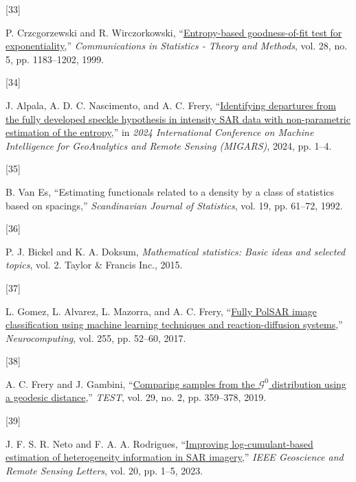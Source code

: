 \documentclass[
  lettersize  journal,
]{IEEEtran}%
\newlength{\cslhangindent}
\newlength{\csllabelwidth}
\newenvironment{CSLReferences}[2] %
 {\begin{list}{}{%
  \setlength{\itemindent}{0pt}
  \setlength{\leftmargin}{0pt}
  \setlength{\parsep}{0pt}
  \ifodd #1
   \setlength{\leftmargin}{\cslhangindent}
   \setlength{\itemindent}{-1\cslhangindent}
  \fi
  \setlength{\itemsep}{#2\baselineskip}}}
 {\end{list}}
\newcommand{\CSLLeftMargin}[1]{\parbox[t]{\csllabelwidth}{\strut#1\strut}}
\newcommand{\CSLRightInline}[1]{\parbox[t]{\linewidth - \csllabelwidth}{\strut#1\strut}}
\providecommand{\DIFaddbegin}{} %
\providecommand{\DIFaddend}{} %
\providecommand{\DIFdelbegin}{} %
\providecommand{\DIFdelend}{} %
\providecommand{\DIFscaledelfig}{0.5}
\newlength{\DIFdelgraphicswidth} %
\newlength{\DIFdelgraphicsheight} %
\providecommand{\DIFaddincludegraphics}[2][]{{\color{blue}\fbox{\DIFOincludegraphics[#1]{#2}}}} %
\providecommand{\DIFdelincludegraphics}[2][]{%
\sbox{\DIFdelgraphicsbox}{\DIFOincludegraphics[#1]{#2}}%
\settoboxwidth{\DIFdelgraphicswidth}{\DIFdelgraphicsbox} %
\settoboxtotalheight{\DIFdelgraphicsheight}{\DIFdelgraphicsbox} %
\scalebox{\DIFscaledelfig}{%
\parbox[b]{\DIFdelgraphicswidth}{\usebox{\DIFdelgraphicsbox}\\[-\baselineskip] \rule{\DIFdelgraphicswidth}{0em}}\llap{\resizebox{\DIFdelgraphicswidth}{\DIFdelgraphicsheight}{%
\setlength{\unitlength}{\DIFdelgraphicswidth}%
\begin{picture}(1,1)%
\thicklines\linethickness{2pt} %
{\color[rgb]{1,0,0}\put(0,0){\framebox(1,1){}}}%
{\color[rgb]{1,0,0}\put(0,0){\line( 1,1){1}}}%
{\color[rgb]{1,0,0}\put(0,1){\line(1,-1){1}}}%
\end{picture}%
}\hspace*{3pt}}} %
} %
\DeclareRobustCommand{\DIFaddbegin}{\DIFOaddbegin \let\includegraphics\DIFaddincludegraphics} %
\DeclareRobustCommand{\DIFaddend}{\DIFOaddend \let\includegraphics\DIFOincludegraphics} %
\DeclareRobustCommand{\DIFdelbegin}{\DIFOdelbegin \let\includegraphics\DIFdelincludegraphics} %
\DeclareRobustCommand{\DIFdelend}{\DIFOaddend \let\includegraphics\DIFOincludegraphics} %
\begin{document}
\begin{CSLReferences}{0}{0}
\DIFdelbegin %
\DIFdelend \DIFaddbegin \CSLLeftMargin{{[}33{]} }\DIFaddend %
\CSLRightInline{P. Crzcgorzewski and R. Wirczorkowski,
{``\href{https://doi.org/10.1080/03610929908832351}{Entropy-based
goodness-of-fit test for exponentiality},''} \emph{Communications in
Statistics - Theory and Methods}, vol. 28, no. 5, pp. 1183--1202, 1999.
}

\DIFdelbegin %
\DIFdelend \DIFaddbegin \CSLLeftMargin{{[}34{]} }\DIFaddend %
\CSLRightInline{J. Alpala, A. D. C. Nascimento, and A. C. Frery,
{``\href{https://doi.org/10.1109/migars61408.2024.10544448}{Identifying
departures from the fully developed speckle hypothesis in intensity
{SAR} data with non-parametric estimation of the entropy},''} in
\emph{2024 {I}nternational {C}onference on {M}achine {I}ntelligence for
{G}eo{A}nalytics and {R}emote {S}ensing ({MIGARS})}, 2024, pp. 1--4. }

\DIFdelbegin %
\DIFdelend \DIFaddbegin \CSLLeftMargin{{[}35{]} }\DIFaddend %
\CSLRightInline{B. Van Es, {``Estimating functionals related to a
density by a class of statistics based on spacings,''}
\emph{Scandinavian Journal of Statistics}, vol. 19, pp. 61--72, 1992. }

\DIFdelbegin %
\DIFdelend \DIFaddbegin \CSLLeftMargin{{[}36{]} }\DIFaddend %
\CSLRightInline{P. J. Bickel and K. A. Doksum, \emph{Mathematical
statistics: Basic ideas and selected topics}, vol. 2. Taylor \& Francis
Inc., 2015. }

\DIFdelbegin %
\DIFdelend \DIFaddbegin \CSLLeftMargin{{[}37{]} }\DIFaddend %
\CSLRightInline{L. Gomez, L. Alvarez, L. Mazorra, and A. C. Frery,
{``\href{https://doi.org/10.1016/j.neucom.2016.08.140}{Fully PolSAR
image classification using machine learning techniques and
reaction-diffusion systems},''} \emph{Neurocomputing}, vol. 255, pp.
52--60, 2017. }

\DIFdelbegin %
\DIFdelend \DIFaddbegin \CSLLeftMargin{{[}38{]} }\DIFaddend %
\CSLRightInline{A. C. Frery and J. Gambini,
{``\href{https://doi.org/10.1007/s11749-019-00658-2}{Comparing samples
from the \({\mathcal {G}}^0\) distribution using a geodesic
distance},''} \emph{TEST}, vol. 29, no. 2, pp. 359--378, 2019. }

\DIFdelbegin %
\DIFdelend \DIFaddbegin \CSLLeftMargin{{[}39{]} }\DIFaddend %
\CSLRightInline{J. F. S. R. Neto and F. A. A. Rodrigues,
{``\href{https://doi.org/10.1109/lgrs.2023.3305119}{Improving
log-cumulant-based estimation of heterogeneity information in {SAR}
imagery},''} \emph{{IEEE} Geoscience and Remote Sensing Letters}, vol.
20, pp. 1--5, 2023. }

\end{CSLReferences}
\DIFaddbegin 
\end{document}
